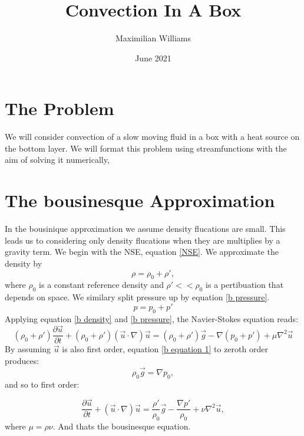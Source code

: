 \documentclass{article}
\title{Convection In A Box}
\author{Maximilian Williams}
\date{June 2021}
\begin{document}
\maketitle

\section*{The Problem}
We will consider convection of a slow moving fluid in a box with a heat source on the bottom layer. We will format this problem using streamfunctions with the aim of solving it numerically,

\section*{The bousinesque Approximation}
In the bousinique approximation we assume density flucations are small. This leads us to considering only density flucations when they are multiplies by a gravity term.
\newline
We begin with the NSE, equation \ref{NSE}. We approximate the density by
\begin{equation}
	\rho = \rho_0 + \rho',
	\label{b density}
\end{equation}
where $\rho_0$ is a constant reference density and $\rho' << \rho_0$ is a pertibuation that depends on space. We similary split pressure up by equation \ref{b pressure}. 
\begin{equation}
	p = p_0 + p'
	\label{b pressure}
\end{equation}
Applying equation \ref{b density} and \ref{b pressure}, the Navier-Stokes equation reads:
\begin{equation}
	(\rho_0 + \rho') \frac{\partial \vec{u}}{\partial t} + (\rho_0 + \rho') (\vec{u} \cdot \nabla) \vec{u} = (\rho_0 + \rho') \vec{g} - \nabla (p_0 + p') + \mu \nabla^2 \vec{u}
	\label{b equation 1}
\end{equation}
By assuming $\vec{u}$ is also first order, equation \ref{b equation 1} to zeroth order produces:
\begin{equation}
	\rho_0 \vec{g} = \nabla p_0,
\end{equation}
and so to first order:

\begin{equation}
	\frac{\partial \vec{u}}{\partial t} + (\vec{u} \cdot \nabla) \vec{u} =  \frac{\rho'}{\rho_0}\vec{g} - \frac{\nabla p'}{\rho_0} + \nu \nabla^2 \vec{u},
	\label{b equation 2}
\end{equation}
where $\mu = \rho \nu$. 
\newline
And thats the bousinesque equation.
\end{document}
